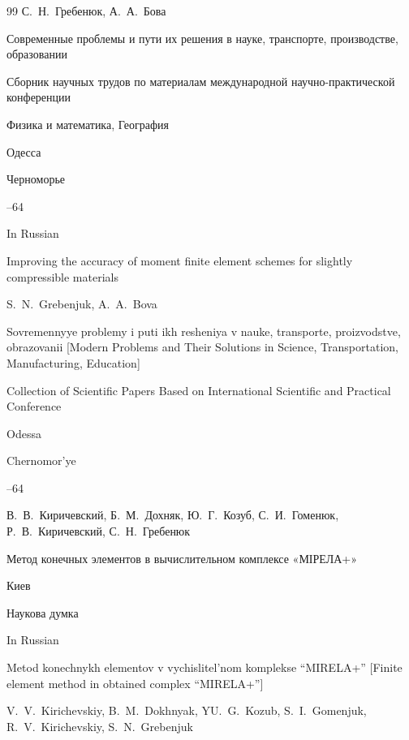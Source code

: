 \begin{thebibliography}{99}
\by С.~Н.~Гребенюк, А.~А.~Бова

\inbook Современные проблемы и пути их решения в науке, транспорте, производстве, образовании

\bookinfo  Сборник научных трудов по материалам международной научно-практической конференции



\volinfo  Физика и математика, География

\publaddr Одесса

\publ Черноморье

--64

\misctransl

\lang In Russian

\paper Improving the accuracy of moment finite element schemes for slightly compressible materials 

\by S.~N.~Grebenjuk, A.~A.~Bova

\inbook Sovremennyye problemy i puti ikh resheniya v nauke, transporte, proizvodstve, obrazovanii \rm [Modern Problems and Their Solutions in Science, Transportation, Manufacturing, Education]

\bookinfo Collection of Scientific Papers Based on International Scientific and Practical Conference 



\publaddr Odessa

\publ Chernomor'ye

--64




\by В.~В.~Киричевский, Б.~М.~Дохняк, Ю.~Г.~Козуб,  С.~И.~Гоменюк, Р.~В.~Киричевский, С.~Н.~Гребенюк

\book Метод конечных элементов в вычислительном комплексе «МІРЕЛА+»

\publaddr Киев

\publ Наукова думка



\misctransl

\lang In Russian

\book  Metod konechnykh elementov v vychislitel'nom komplekse ``MIRELA+'' \rm [Finite element method in obtained complex ``MIRELA+'']

\by V.~V.~Kirichevskiy, B.~M.~Dokhnyak, YU.~G.~Kozub, S.~I.~Gomenjuk, R.~V.~Kirichevskiy, S.~N.~Grebenjuk


\end{thebibliography}
